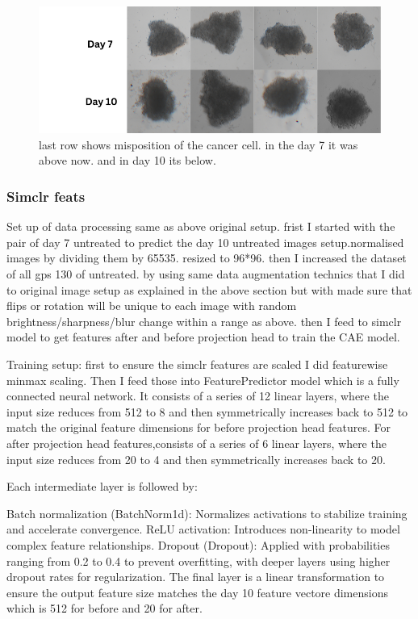 \begin{figure}[H]
  \centering
  \includegraphics[scale=0.5]{figures/pproblem.png} 
  \caption{last row shows misposition of the cancer cell. in the day 7 it was above now. and in day 10 its below.}
  \label{fig:unloss}
\end{figure}

\subsubsection*{Simclr feats}
Set up of data processing same as above original setup.
frist I started with the pair of day 7 untreated to predict the day 10 untreated images setup.normalised images by dividing them by 65535. resized to 96*96. then
I increased the dataset of all gps 130 of untreated. by using same data augmentation technics that I did to original image setup as explained in the above section but with made sure that flips or rotation will be unique to each image with random brightness/sharpness/blur change within a range as above. then I feed to simclr model 
to get features after and before projection head to train the CAE model. 

Training setup: first to ensure the simclr features are scaled I did featurewise minmax scaling. Then I feed those into FeaturePredictor model which is a fully 
connected neural network. It consists of a series of 12 linear layers, where the input size reduces from 512 to 8 and then symmetrically increases back to 512 to
 match the original feature dimensions for before projection head features. For after projection head features,consists of a series of 6 linear layers, where the 
 input size reduces from 20 to 4 and then symmetrically increases back to 20.

Each intermediate layer is followed by:

Batch normalization (BatchNorm1d): Normalizes activations to stabilize training and accelerate convergence.
ReLU activation: Introduces non-linearity to model complex feature relationships.
Dropout (Dropout): Applied with probabilities ranging from 0.2 to 0.4 to prevent overfitting, with deeper layers using higher dropout rates for regularization.
The final layer is a linear transformation to ensure the output feature size matches the day 10 feature vectore dimensions which is 512 for before and 20 for after.

